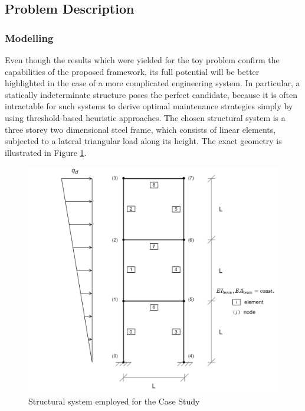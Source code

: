 

\subsection{Problem Description}




\subsubsection{Modelling} \label{modelCaseSec}

Even though the results which were yielded for the toy problem confirm the capabilities of the proposed framework, its full potential will be better highlighted in the case of a more complicated engineering system. In particular, a statically indeterminate structure poses the perfect candidate, because it is often intractable for such systems to derive optimal maintenance strategies simply by using threshold-based heuristic approaches. The chosen structural system is a three storey two dimensional steel frame, which consists of linear elements, subjected to a lateral triangular load along its height. The exact geometry is illustrated in Figure \ref{caseStudyGeom}.

\begin{figure}[H]
    \centering
	\includegraphics[width=\linewidth]{Figures/frameGeom.png}
	\caption{Structural system employed for the Case Study}
	\label{caseStudyGeom}
\end{figure}


